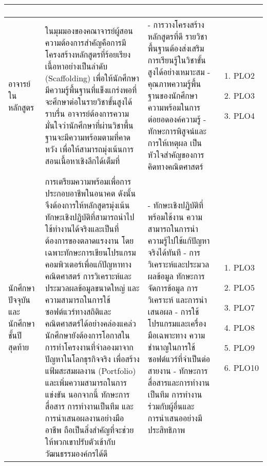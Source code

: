 \begin{longtable}{| >{\raggedright}p{} | >{\raggedright}p{} | >{\raggedright}p{} | >{\centering\arraybackslash}p{} |}
\begin{enumerate}[label={}]
\end{enumerate}
 \\
    \hline
    อาจารย์ในหลักสูตร &
ในมุมมองของคณาจารย์ผู้สอน ความต้องการสำคัญคือการมีโครงสร้างหลักสูตรที่ร้อยเรียงเนื้อหาอย่างเป็นลำดับ (Scaffolding) เพื่อให้นักศึกษามีความรู้พื้นฐานที่แข็งแกร่งพอที่จะศึกษาต่อในรายวิชาขั้นสูงได้ราบรื่น อาจารย์ต้องการความมั่นใจว่านักศึกษาที่ผ่านวิชาพื้นฐานจะมีความพร้อมตามที่คาดหวัง เพื่อให้สามารถมุ่งเน้นการสอนเนื้อหาเชิงลึกได้เต็มที่  &
- การวางโครงสร้างหลักสูตรที่ดี รายวิชาพื้นฐานต้องส่งเสริมการเรียนรู้ในวิชาขั้นสูงได้อย่างเหมาะสม \newline
- คุณภาพความรู้พื้นฐานของนักศึกษา ความพร้อมในการต่อยอดองค์ความรู้ \newline
- ทักษะการพิสูจน์และการให้เหตุผล เป็นหัวใจสำคัญของการคิดทางคณิตศาสตร์ &
\begin{enumerate}[label={}]
	\item PLO2
	\item PLO3
	\item PLO4
\end{enumerate}
 \\
    \hline
    นักศึกษาปัจจุบันและนักศึกษาชั้นปีสุดท้าย & 
การเตรียมความพร้อมเพื่อการประกอบอาชีพในอนาคต ดังนั้นจึงต้องการให้หลักสูตรมุ่งเน้นทักษะเชิงปฏิบัติที่สามารถนำไปใช้ทำงานได้จริงและเป็นที่ต้องการของตลาดแรงงาน โดยเฉพาะทักษะการเขียนโปรแกรมคอมพิวเตอร์เพื่อแก้ปัญหาทางคณิตศาสตร์ การวิเคราะห์และประมวลผลข้อมูลขนาดใหญ่ และความสามารถในการใช้ซอฟต์แวร์ทางสถิติและคณิตศาสตร์ได้อย่างคล่องแคล่ว นักศึกษายังต้องการโอกาสในการทำโครงงานที่จำลองมาจากปัญหาในโลกธุรกิจจริง เพื่อสร้างแฟ้มสะสมผลงาน (Portfolio) และเพิ่มความสามารถในการแข่งขัน นอกจากนี้ ทักษะการสื่อสาร การทำงานเป็นทีม และการนำเสนอผลงานอย่างมืออาชีพ ถือเป็นสิ่งสำคัญที่จะช่วยให้พวกเขาปรับตัวเข้ากับวัฒนธรรมองค์กรได้ดี &
- ทักษะเชิงปฏิบัติที่พร้อมใช้งาน ความสามารถในการนำความรู้ไปใช้แก้ปัญหาจริงได้ทันที \newline
- การวิเคราะห์และประมวลผลข้อมูล ทักษะการจัดการข้อมูล การวิเคราะห์ และการนำเสนอผล \newline
- การใช้โปรแกรมและเครื่องมือเฉพาะทาง ความชำนาญในการใช้ซอฟต์แวร์ที่จำเป็นต่อสายงาน \newline
- ทักษะการสื่อสารและการทำงานเป็นทีม การทำงานร่วมกับผู้อื่นและการนำเสนออย่างมีประสิทธิภาพ &
\begin{enumerate}[label={}]
	\item PLO3
	\item PLO5
	\item PLO7
	\item PLO8
	\item PLO9
	\item PLO10
\end{enumerate}
 \\
    \hline
\end{longtable}

